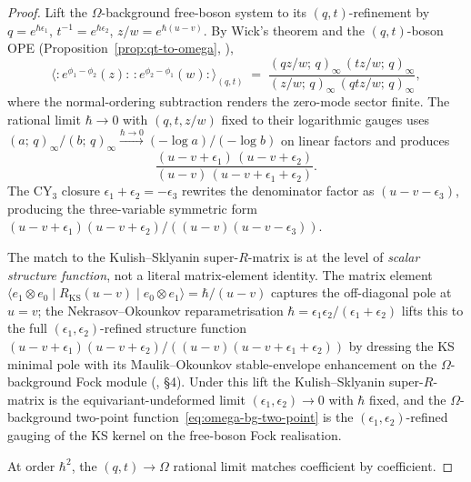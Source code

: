 \begin{proof}
Lift the $\Omega$-background free-boson system to its
$(q, t)$-refinement by $q = e^{\hbar\epsilon_1}$,
$t^{-1} = e^{\hbar\epsilon_2}$, $z/w = e^{\hbar(u-v)}$. By Wick's
theorem and the $(q, t)$-boson OPE
(Proposition~\ref{prop:qt-to-omega}, \cite{ShiraishiKuboAwataOdake1996}),
\[
 \langle :e^{\phi_1 - \phi_2}(z):\,
 :e^{\phi_2 - \phi_1}(w): \rangle_{(q,t)}
 \;=\;
 \frac{(q z/w;\, q)_\infty\, (t z/w;\, q)_\infty}
 {(z/w;\, q)_\infty\, (qt z/w;\, q)_\infty},
\]
where the normal-ordering subtraction renders the zero-mode sector
finite. The rational limit $\hbar \to 0$ with $(q, t, z/w)$
fixed to their logarithmic gauges uses
$(a;\, q)_\infty / (b;\, q)_\infty \xrightarrow{\hbar \to 0}
 (-\log a)/(-\log b)$ on linear factors and produces
\[
 \frac{(u - v + \epsilon_1)\, (u - v + \epsilon_2)}
 {(u - v)\, (u - v + \epsilon_1 + \epsilon_2)}.
\]
The CY$_3$ closure $\epsilon_1 + \epsilon_2 = -\epsilon_3$ rewrites
the denominator factor as $(u - v - \epsilon_3)$, producing the
three-variable symmetric form
$(u-v+\epsilon_1)(u-v+\epsilon_2)/((u-v)(u-v-\epsilon_3))$.

The match to the Kulish--Sklyanin super-$R$-matrix is at the level
of \emph{scalar structure function}, not a literal matrix-element
identity. The matrix element
$\langle e_1 \otimes e_0 \mid R_{\mathrm{KS}}(u-v) \mid e_0 \otimes e_1\rangle
= \hbar/(u-v)$
captures the off-diagonal pole at $u = v$; the Nekrasov--Okounkov
reparametrisation
$\hbar = \epsilon_1\epsilon_2/(\epsilon_1+\epsilon_2)$
lifts this to the full
$(\epsilon_1, \epsilon_2)$-refined structure function
$(u-v+\epsilon_1)(u-v+\epsilon_2)/((u-v)(u-v+\epsilon_1+\epsilon_2))$
by dressing the KS minimal pole with its Maulik--Okounkov
stable-envelope enhancement on the $\Omega$-background Fock module
(\cite{MaulikOkounkov2019}, \S 4). Under this lift the Kulish--Sklyanin
super-$R$-matrix is the equivariant-undeformed limit
$(\epsilon_1, \epsilon_2) \to 0$ with $\hbar$ fixed, and the
$\Omega$-background two-point
function~\eqref{eq:omega-bg-two-point} is the
$(\epsilon_1, \epsilon_2)$-refined gauging of the KS kernel on the
free-boson Fock realisation.

At order $\hbar^2$, the $(q,t)\to\Omega$ rational limit matches
coefficient by coefficient.
\end{proof}

